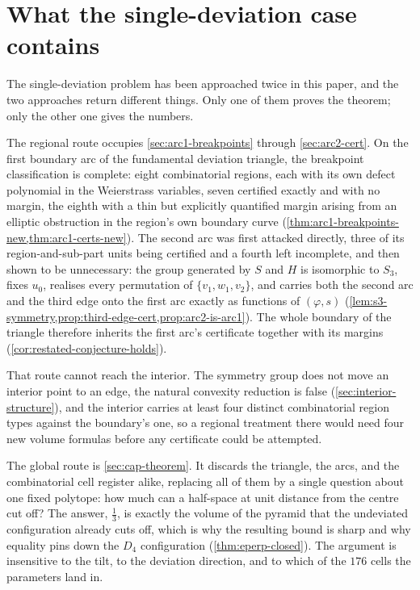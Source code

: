 \documentclass[11pt,reqno]{amsart}
\renewcommand{\_}{\origunderscore\allowbreak}
\numberwithin{equation}{section}
\theoremstyle{plain}
\theoremstyle{definition}
\theoremstyle{remark}
\newcommand{\tilt}{\varphi}                  %
\newcommand{\arcp}{s}                        %
\newcommand{\base}{u}                        %
\begin{document}
\section{What the single-deviation case contains}\label{sec:deviation-scope-summary}

The single-deviation problem has been approached twice in this paper,
and the two approaches return different things. Only one of them proves
the theorem; only the other one gives the numbers.

The regional route occupies \cref{sec:arc1-breakpoints} through
\cref{sec:arc2-cert}. On the first boundary arc of the fundamental
deviation triangle, the breakpoint classification is complete: eight
combinatorial regions, each with its own defect polynomial in the
Weierstrass variables, seven certified exactly and with no margin, the
eighth with a thin but explicitly quantified margin arising from an
elliptic obstruction in the region's own boundary curve
(\cref{thm:arc1-breakpoints-new,thm:arc1-certs-new}). The second arc
was first attacked directly, three of its region-and-sub-part units
being certified and a fourth left incomplete, and then shown to be
unnecessary: the group generated by $S$ and $H$ is isomorphic to $S_3$,
fixes $\base_0$, realises every permutation of $\{v_1,w_1,v_2\}$, and
carries both the second arc and the third edge onto the first arc
exactly as functions of $(\tilt,\arcp)$
(\cref{lem:s3-symmetry,prop:third-edge-cert,prop:arc2-is-arc1}). The
whole boundary of the triangle therefore inherits the first arc's
certificate together with its margins
(\cref{cor:restated-conjecture-holds}).

That route cannot reach the interior. The symmetry group does not move
an interior point to an edge, the natural convexity reduction is false
(\cref{sec:interior-structure}), and the interior carries at least four
distinct combinatorial region types against the boundary's one, so a
regional treatment there would need four new volume formulas before any
certificate could be attempted.

The global route is \cref{sec:cap-theorem}. It discards the triangle,
the arcs, and the combinatorial cell register alike, replacing all of
them by a single question about one fixed polytope: how much can a
half-space at unit distance from the centre cut off? The answer,
$\tfrac13$, is exactly the volume of the pyramid that the undeviated
configuration already cuts off, which is why the resulting bound is
sharp and why equality pins down the $D_4$ configuration
(\cref{thm:eperp-closed}). The argument is insensitive to the tilt, to
the deviation direction, and to which of the $176$ cells the parameters
land in.
\end{document}
